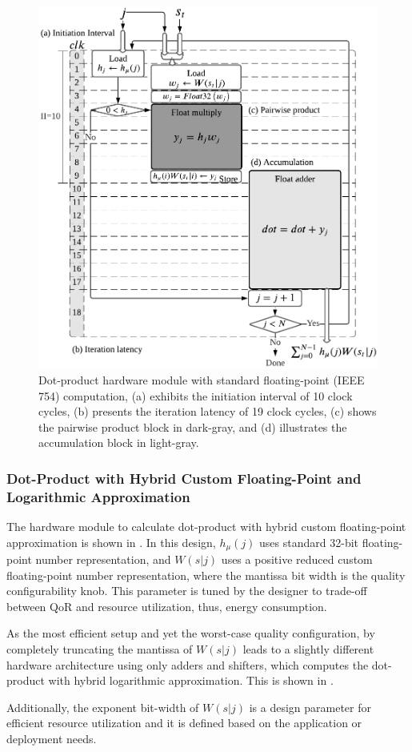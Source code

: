 \begin{figure}[b!]
	\centering
	\includegraphics[width=0.5\columnwidth]{./chapters/sbs_accelerator/figures/dot_product_float.pdf}
	\caption{Dot-product hardware module with standard floating-point (IEEE 754) computation, (a) exhibits the initiation interval of 10 clock cycles, (b) presents the iteration latency of 19 clock cycles, (c) shows the pairwise product block in dark-gray, and (d) illustrates the accumulation block in light-gray.}
	\label{fig:dot_product_float}
\end{figure}

\subsubsection{Dot-Product with Hybrid Custom Floating-Point and Logarithmic Approximation}
 The hardware module to calculate dot-product with hybrid custom floating-point approximation is shown in . In this design, $h_\mu(j)$ uses standard 32-bit floating-point number representation, and $W(s|j)$ uses a positive reduced custom floating-point number representation, where the mantissa bit width is the quality configurability knob. This parameter is tuned by the designer to trade-off between QoR and resource utilization, thus, energy consumption.
 
 As the most efficient setup and yet the worst-case quality configuration, by completely truncating the mantissa of $W(s|j)$ leads to a slightly different hardware architecture using only adders and shifters, which computes the dot-product with hybrid logarithmic approximation. This is shown in .
 
Additionally, the exponent bit-width of $W(s|j)$ is a design parameter for efficient resource utilization and it is defined based on the application or deployment needs.
 
